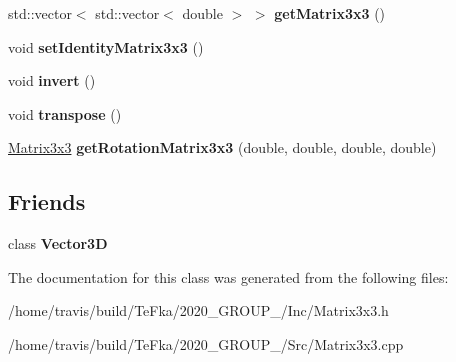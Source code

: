\begin{DoxyCompactItemize}
\item 
std\+::vector$<$ std\+::vector$<$ double $>$ $>$ {\bfseries get\+Matrix3x3} ()\hypertarget{class_matrix3x3_a8f22384da78b154f454241659b731466}{}\label{class_matrix3x3_a8f22384da78b154f454241659b731466}

\item 
void {\bfseries set\+Identity\+Matrix3x3} ()\hypertarget{class_matrix3x3_ad3aec636b7f82d5874c94f7b70b9cd1b}{}\label{class_matrix3x3_ad3aec636b7f82d5874c94f7b70b9cd1b}

\item 
void {\bfseries invert} ()\hypertarget{class_matrix3x3_aed02f0e19f32d1f633483f91c48e6538}{}\label{class_matrix3x3_aed02f0e19f32d1f633483f91c48e6538}

\item 
void {\bfseries transpose} ()\hypertarget{class_matrix3x3_a17970c50970d868be9657283e7d7912b}{}\label{class_matrix3x3_a17970c50970d868be9657283e7d7912b}

\item 
\hyperlink{class_matrix3x3}{Matrix3x3} {\bfseries get\+Rotation\+Matrix3x3} (double, double, double, double)\hypertarget{class_matrix3x3_a1cacc9b5af0d31f305bf5f45b930cc3d}{}\label{class_matrix3x3_a1cacc9b5af0d31f305bf5f45b930cc3d}

\end{DoxyCompactItemize}
\subsection*{Friends}
\begin{DoxyCompactItemize}
\item 
class {\bfseries Vector3D}\hypertarget{class_matrix3x3_a166ef6ddf8d6949db83102b57b30401a}{}\label{class_matrix3x3_a166ef6ddf8d6949db83102b57b30401a}

\end{DoxyCompactItemize}


The documentation for this class was generated from the following files\+:\begin{DoxyCompactItemize}
\item 
/home/travis/build/\+Te\+Fka/2020\+\_\+\+G\+R\+O\+U\+P\+\_/\+Inc/Matrix3x3.\+h\item 
/home/travis/build/\+Te\+Fka/2020\+\_\+\+G\+R\+O\+U\+P\+\_/\+Src/Matrix3x3.\+cpp\end{DoxyCompactItemize}
